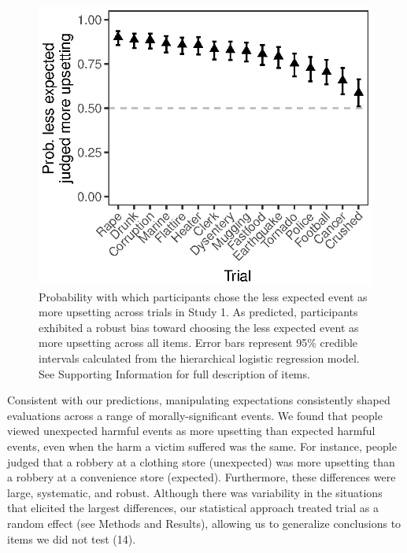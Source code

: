\documentclass[9pt,twocolumn,twoside,lineno]{pnas-new}
\begin{document}
\begin{figure}
\centering
\includegraphics{fig1.eps}
\caption{Probability with which participants chose the less expected
event as more upsetting across trials in Study 1. As predicted,
participants exhibited a robust bias toward choosing the less expected
event as more upsetting across all items. Error bars represent 95\%
credible intervals calculated from the hierarchical logistic regression
model. See Supporting Information for full description of items. {}}
\end{figure}

Consistent with our predictions, manipulating expectations consistently
shaped evaluations across a range of morally-significant events. We
found that people viewed unexpected harmful events as more upsetting
than expected harmful events, even when the harm a victim suffered was
the same. For instance, people judged that a robbery at a clothing store
(unexpected) was more upsetting than a robbery at a convenience store
(expected). Furthermore, these differences were large, systematic, and
robust. Although there was variability in the situations that elicited
the largest differences, our statistical approach treated trial as a
random effect (see Methods and Results), allowing us to generalize
conclusions to items we did not test (14).
\end{document}
